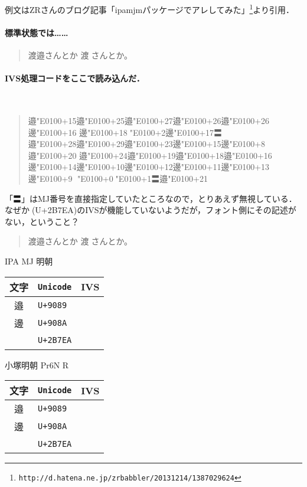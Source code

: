 \documentclass{ltjsarticle}
\def\MJI[#1]#2{#2\char\numexpr "E0100+#1\relax}%
\def\IVSL#1{\directlua{list_ivs('#1')}}
\begin{document}

例文はZRさんのブログ記事「ipamjmパッケージでアレしてみた」\footnote{%
\verb+http://d.hatena.ne.jp/zrbabbler/20131214/1387029624+}より引用．

\paragraph{標準状態では……}
\begin{quote}
\LARGE
渡邉󠄏さんとか   %
渡𫟪󠄂さんとか。%
\end{quote}

\paragraph{IVS処理コードをここで読み込んだ．}\ 

\begin{quote}
\LARGE
\MJI[15]{邉}\MJI[25]{邉}\MJI[27]{邉}\MJI[26]{邉}\MJI[26]{邉}\MJI[16]{邊}
\MJI[18]{邊}\MJI[2]{𫟪}\MJI[17]{邊}〓\\
\MJI[28]{邉}\MJI[29]{邉}\MJI[23]{邉}\MJI[15]{邊}\MJI[8]{邊}\MJI[20]{邉}
\MJI[24]{邉}\MJI[19]{邉}\MJI[18]{邉}\MJI[16]{邉}\\
\MJI[14]{邊}\MJI[10]{邊}\MJI[12]{邊}\MJI[11]{邊}\MJI[13]{邊}\MJI[9]{邊}
\MJI[0]{𫟪}\MJI[1]{𫟪}〓\MJI[21]{邉}
\end{quote}
「〓」はMJ番号を直接指定していたところなので，とりあえず無視している．
なぜか𫟪(U+2B7EA)のIVSが機能していないようだが，フォント側にその記述がない，ということ？

\begin{quote}
\LARGE
渡邉󠄏さんとか   %
渡𫟪󠄂さんとか。%
\end{quote}

\begin{center}
IPA MJ 明朝\par\medskip
\Large
\begin{tabular}{c>{\tt}ll}
\toprule
文字&Unicode&IVS\\
\midrule
邉&U+9089&\IVSL{邉}\\
邊&U+908A&\IVSL{邊}\\
𫟪&U+2B7EA&\IVSL{𫟪}\\
\bottomrule
\end{tabular}
\end{center}

\begin{center}
小塚明朝 Pr6N R\par\medskip
\Large
\begin{tabular}{c>{\tt}ll}
\toprule
文字&Unicode&IVS\\
\midrule
邉&U+9089&\IVSL{邉}\\
邊&U+908A&\IVSL{邊}\\
𫟪&U+2B7EA&\IVSL{𫟪}\\
\bottomrule
\end{tabular}
\end{center}
\end{document}
